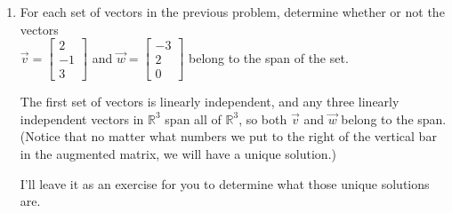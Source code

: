 \documentclass[12pt]{article}
\newcommand{\R}{\mathbb{R}}
\newcommand{\bbm}{\begin{bmatrix}}
\newcommand{\ebm}{\end{bmatrix}}
\begin{document}
\begin{enumerate}
\begin{enumerate}
\end{enumerate}

\item For each set of vectors in the previous problem, determine whether or not the vectors\\ $\vec{v} = \bbm 2\\-1\\3\ebm$ and $\vec{w} = \bbm -3\\2\\0\ebm$ belong to the span of the set.

The first set of vectors is linearly independent, and any three linearly independent vectors in $\R^3$ span all of $\R^3$, so both $\vec{v}$ and $\vec{w}$ belong to the span. (Notice that no matter what numbers we put to the right of the vertical bar in the augmented matrix, we will have a unique solution.)

I'll leave it as an exercise for you to determine what those unique solutions are.


\end{enumerate}
\end{document}
